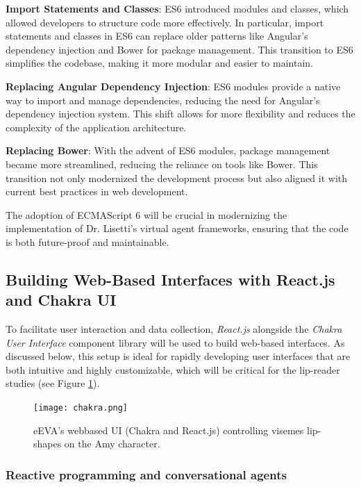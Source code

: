 \documentclass[12pt]{article}
\begin{document}
\textbf{Import Statements and Classes}: ES6 introduced modules and classes, which allowed developers to structure code more effectively. In particular, import statements and classes in ES6 can replace older patterns like Angular’s dependency injection and Bower for package management. This transition to ES6 simplifies the codebase, making it more modular and easier to maintain.

\textbf{Replacing Angular Dependency Injection}: ES6 modules provide a native way to import and manage dependencies, reducing the need for Angular’s dependency injection system. This shift allows for more flexibility and reduces the complexity of the application architecture.

\textbf{Replacing Bower}: With the advent of ES6 modules, package management became more streamlined, reducing the reliance on tools like Bower. This transition not only modernized the development process but also aligned it with current best practices in web development.

The adoption of ECMAScript 6 will be  crucial in modernizing the implementation of Dr. Lisetti’s virtual agent frameworks, ensuring that the code is both future-proof and maintainable.

\subsection{Building Web-Based Interfaces with React.js and Chakra UI}

To facilitate user interaction and data collection, {\em React.js} alongside the {\em Chakra User Interface} component library will be used to build web-based interfaces. As discussed below, this setup is ideal for rapidly developing user interfaces that are both intuitive and highly customizable, which will be critical for the lip-reader studies (see Figure \ref{fig:chakra}).

\begin{figure}
    \centering
    \vspace{-3mm}
    \texttt{[image: chakra.png]}
    \caption{eEVA's webbased UI (Chakra and React.js) controlling visemes lip-shapes on the Amy character. }
    \label{fig:chakra}
\end{figure}
\subsubsection{Reactive programming and conversational agents} 
\end{document}
